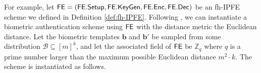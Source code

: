 






For example, let ${\sf FE} = ({\sf FE.Setup}, {\sf FE.KeyGen}, {\sf FE.Enc}, {\sf FE.Dec})$ be an fh-IPFE scheme we defined in Definition \ref{def:fh-IPFE}. Following \cite{cryptoeprint:2023/481}, we can instantiate a biometric authentication scheme using ${\sf FE}$ with the distance metric the Euclidean distance. Let the biometric templates $\mathbf{b}$ and $\mathbf{b'}$ be sampled from some distribution $\mathcal{B} \subseteq [m]^k$, and let the associated field of ${\sf FE}$ be $\mathbb{Z}_q$ where $q$ is a prime number larger than the maximum possible Euclidean distance $m^2 \cdot k$. The scheme is instantiated as follows.

